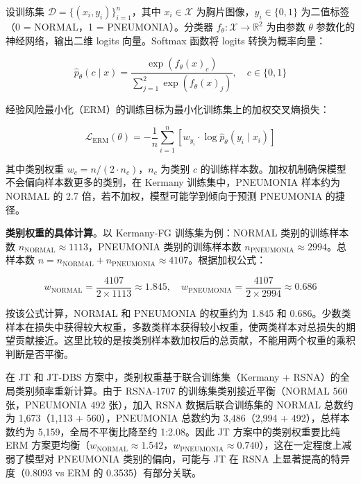 \documentclass[12pt,a4paper,UTF8,openany]{ctexbook}
\begin{document}
设训练集 $\mathcal{D} = \{(x_i, y_i)\}_{i=1}^{n}$，其中 $x_i \in \mathcal{X}$ 为胸片图像，$y_i \in \{0, 1\}$ 为二值标签（0 = NORMAL，1 = PNEUMONIA）。分类器 $f_\theta: \mathcal{X} \to \mathbb{R}^2$ 为由参数 $\theta$ 参数化的神经网络，输出二维 logits 向量。Softmax 函数将 logits 转换为概率向量：

\begin{equation}
\hat{p}_\theta(c \mid x) = \frac{\exp\left(f_\theta(x)_c\right)}{\sum_{j=1}^{2} \exp\left(f_\theta(x)_j\right)}, \quad c \in \{0, 1\}
\end{equation}

经验风险最小化（ERM）的训练目标为最小化训练集上的加权交叉熵损失：

\begin{equation}
\mathcal{L}_{\text{ERM}}(\theta) = -\frac{1}{n}\sum_{i=1}^{n}\left[w_{y_i} \cdot \log \hat{p}_\theta(y_i \mid x_i)\right]
\end{equation}

其中类别权重 $w_c = n / (2 \cdot n_c)$，$n_c$ 为类别 $c$ 的训练样本数。加权机制确保模型不会偏向样本数更多的类别，在 Kermany 训练集中，PNEUMONIA 样本约为 NORMAL 的 2.7 倍，若不加权，模型可能学到倾向于预测 PNEUMONIA 的捷径。

\textbf{类别权重的具体计算}。以 Kermany-FG 训练集为例：NORMAL 类别的训练样本数 $n_{\text{NORMAL}} \approx 1113$，PNEUMONIA 类别的训练样本数 $n_{\text{PNEUMONIA}} \approx 2994$。总样本数 $n = n_{\text{NORMAL}} + n_{\text{PNEUMONIA}} \approx 4107$。根据加权公式：

\begin{equation}
w_{\text{NORMAL}} = \frac{4107}{2 \times 1113} \approx 1.845, \quad
w_{\text{PNEUMONIA}} = \frac{4107}{2 \times 2994} \approx 0.686
\end{equation}

按该公式计算，NORMAL 和 PNEUMONIA 的权重约为 1.845 和 0.686。少数类样本在损失中获得较大权重，多数类样本获得较小权重，使两类样本对总损失的期望贡献接近。这里比较的是按类别样本数加权后的总贡献，不能用两个权重的乘积判断是否平衡。

在 JT 和 JT-DBS 方案中，类别权重基于联合训练集（Kermany + RSNA）的全局类别频率重新计算。由于 RSNA-1707 的训练集类别接近平衡（NORMAL 560 张，PNEUMONIA 492 张），加入 RSNA 数据后联合训练集的 NORMAL 总数约为 1,673（1,113 + 560），PNEUMONIA 总数约为 3,486（2,994 + 492），总样本数约为 5,159，全局不平衡比降至约 1:2.08。因此 JT 方案中的类别权重要比纯 ERM 方案更均衡（$w_{\text{NORMAL}} \approx 1.542$，$w_{\text{PNEUMONIA}} \approx 0.740$），这在一定程度上减弱了模型对 PNEUMONIA 类别的偏向，可能与 JT 在 RSNA 上显著提高的特异度（0.8093 vs ERM 的 0.3535）有部分关联。
\end{document}
